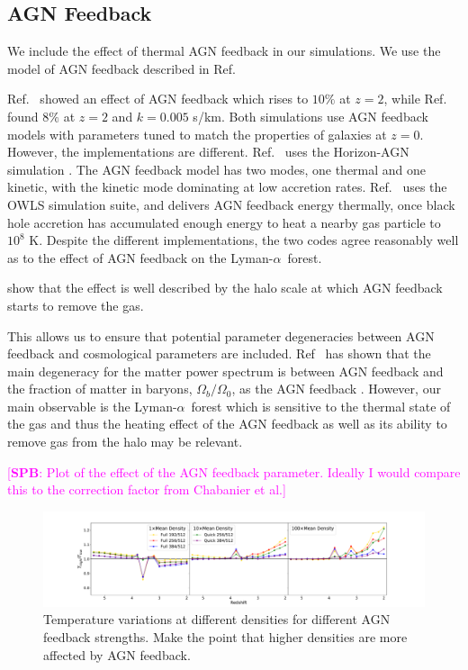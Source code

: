 \documentclass[a4paper,11pt]{article}
\newcommand{\spb}[1]{{\textcolor{magenta}{[{\bf SPB}: #1]}}}
\newcommand{\Lya}{Lyman-$\alpha$}
\begin{document}
\subsection{AGN Feedback}

We include the effect of thermal AGN feedback in our simulations. We use the model of AGN feedback described in Ref.~\cite{Bird:2022}

Ref.~\cite{Viel:2013} showed an effect of AGN feedback which rises to $10\%$ at $z=2$, while Ref.~\cite{Chabanier:2020} found $8\%$ at $z=2$ and $k = 0.005$ s/km. Both simulations use AGN feedback models with parameters tuned to match the properties of galaxies at $z=0$. However, the implementations are different. Ref.~\cite{Chabanier:2020} uses the Horizon-AGN simulation \cite{Dubois:2016}. The AGN feedback model has two modes, one thermal and one kinetic, with the kinetic mode dominating at low accretion rates. Ref.~\cite{Viel:2013} uses the OWLS simulation suite, and delivers AGN feedback energy thermally, once black hole accretion has accumulated enough energy to heat a nearby gas particle to $10^8$ K. Despite the different implementations, the two codes agree reasonably well as to the effect of AGN feedback on the \Lya~forest.

\cite{Giri:2021} show that the effect is well described by the halo scale at which AGN feedback starts to remove the gas.



This allows us to ensure that potential parameter degeneracies between AGN feedback and cosmological parameters are included. Ref~\cite{Schneider:2015} has shown that the main degeneracy for the matter power spectrum is between AGN feedback and the fraction of matter in baryons, $\Omega_b / \Omega_0$, as the AGN feedback . However, our main observable is the \Lya~forest which is sensitive to the thermal state of the gas and thus the heating effect of the AGN feedback as well as its ability to remove gas from the halo may be relevant.

\spb{Plot of the effect of the AGN feedback parameter. Ideally I would compare this to the correction factor from Chabanier et al.}

\begin{figure}
\includegraphics[width=1.\textwidth]{figures/comp-temps_fq.pdf}
 \caption{Temperature variations at different densities for different AGN feedback strengths. Make the point that higher densities are more affected by AGN feedback.}
 \label{fig:AGNtemp}
\end{figure}
\end{document}
